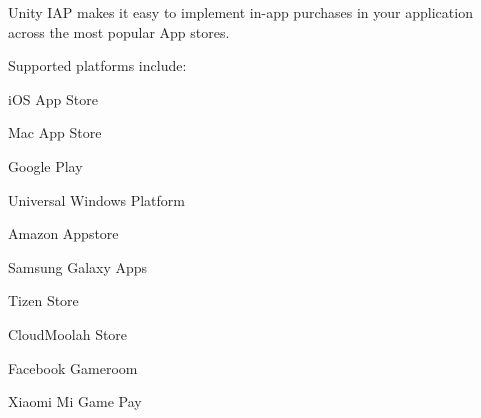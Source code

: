 Unity I\+AP makes it easy to implement in-\/app purchases in your application across the most popular App stores.

Supported platforms include\+:


\begin{DoxyItemize}
\item i\+OS App Store
\item Mac App Store
\item Google Play
\item Universal Windows Platform
\item Amazon Appstore
\item Samsung Galaxy Apps
\item Tizen Store
\item Cloud\+Moolah Store
\item Facebook Gameroom
\item Xiaomi Mi Game Pay 
\end{DoxyItemize}
